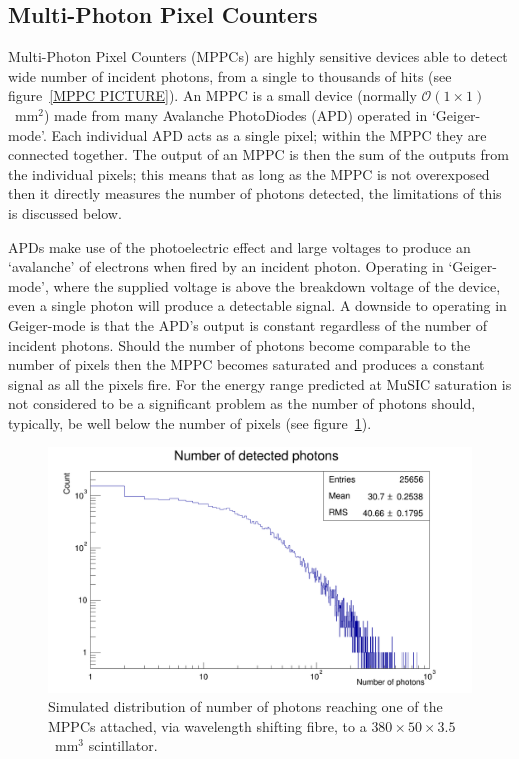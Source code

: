 \subsection{Multi-Photon Pixel Counters} %
\label{sub:multi_photon_pixel_counters}
Multi-Photon Pixel Counters (MPPCs) are highly sensitive devices able to detect wide number of incident photons, from a single to thousands of hits (see figure~\ref{MPPC PICTURE}). An MPPC is a small device (normally \( \mathcal{O}(1\times1) \)~mm\(^2\)) made from many Avalanche PhotoDiodes (APD) operated in `Geiger-mode'. Each individual APD acts as a single pixel; within the MPPC they are connected together. The output of an MPPC is then the sum of the outputs from the individual pixels; this means that as long as the MPPC is not overexposed then it directly measures the number of photons detected, the limitations of this is discussed below.

APDs make use of the photoelectric effect and large voltages to produce an `avalanche' of electrons when fired by an incident photon. Operating in `Geiger-mode', where the supplied voltage is above the breakdown voltage of the device, even a single photon will produce a detectable signal. A downside to operating in Geiger-mode is that the APD's output is constant regardless of the number of incident photons. Should the number of photons become comparable to the number of pixels then the MPPC becomes saturated and produces a constant signal as all the pixels fire. For the energy range predicted at MuSIC saturation is not considered to be a significant problem as the number of photons should, typically, be well below the number of pixels (see figure~\ref{fig:sim_n_photons}).
\begin{figure}[hptb] 
  \centering    \includegraphics[width=.9\textwidth]{images/plot_generating_scripts/n_photons.png}
  \caption{Simulated distribution of number of photons reaching one of the MPPCs attached, via wavelength shifting fibre, to a \(380\times50\times3.5\)~mm\(^3\) scintillator.}
  \label{fig:sim_n_photons}
\end{figure}



